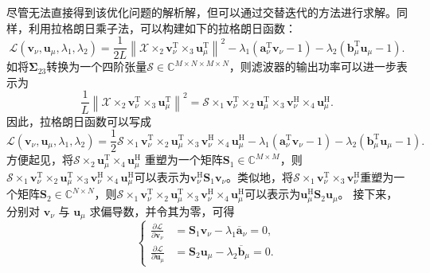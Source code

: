 尽管无法直接得到该优化问题的解析解，但可以通过交替迭代的方法进行求解。同样，利用拉格朗日乘子法，可以构建如下的拉格朗日函数：
\[
    \mathcal{L}(\bm{v}_{\nu}, \bm{u}_{\mu}, \lambda_1, \lambda_2)
    = \frac{1}{2L} \left\| \mathcal{X} \times_2 \bm{v}_{\nu}^{\mathrm{T}} \times_3 \bm{u}_{\mu}^{\mathrm{T}} \right\|^2
    - \lambda_1 \left( \bm{a}^{\mathrm{T}}_{\nu} \bm{v}_{\nu} - 1 \right)
    - \lambda_2 \left( \bm{b}^{\mathrm{T}}_{\mu} \bm{u}_{\mu} - 1 \right).
\]
如将\( \mathbf{\Sigma}_{23} \)转换为一个四阶张量\( \mathcal{S} \in \mathbb{C}^{M \times N \times M \times N} \)，则滤波器的输出功率可以进一步表示为
\[
    \frac{1}{L} \left\| \mathcal{X} \times_2 \bm{v}_{\nu}^{\mathrm{T}} \times_3 \bm{u}_{\mu}^{\mathrm{T}} \right\|^2 = \mathcal{S} \times_1 \bm{v}_{\nu}^{\mathrm{T}} \times_2 \bm{u}_{\mu}^{\mathrm{T}} \times_3 \bm{v}_{\nu}^{\mathrm{H}} \times_4 \bm{u}_{\mu}^{\mathrm{H}}.
\]
因此，拉格朗日函数可以写成
\[
    \mathcal{L}(\bm{v}_{\nu}, \bm{u}_{\mu}, \lambda_1, \lambda_2)
    = \frac{1}{2}\mathcal{S} \times_1 \bm{v}_{\nu}^{\mathrm{T}} \times_2 \bm{u}_{\mu}^{\mathrm{T}} \times_3 \bm{v}_{\nu}^{\mathrm{H}} \times_4 \bm{u}_{\mu}^{\mathrm{H}}
    - \lambda_1 \left( \bm{a}^{\mathrm{T}}_{\nu} \bm{v}_{\nu} - 1 \right)
    - \lambda_2 \left( \bm{b}^{\mathrm{T}}_{\mu} \bm{u}_{\mu} - 1 \right).
\]
方便起见，将\(\mathcal{S} \times_2 \bm{u}_{\mu}^{\mathrm{T}} \times_4 \bm{u}_{\mu}^{\mathrm{H}}\) 重塑为一个矩阵\( \mathbf{S}_{1} \in \mathbb{C}^{M \times M} \)，则\(  \mathcal{S} \times_1 \bm{v}_{\nu}^{\mathrm{T}} \times_2 \bm{u}_{\mu}^{\mathrm{T}} \times_3 \bm{v}_{\nu}^{\mathrm{H}} \times_4 \bm{u}_{\mu}^{\mathrm{H}} \)可以表示为\(\bm{v}_{\nu}^{\mathrm{H}} \mathbf{S}_1 \bm{v}_{\nu}\)。类似地，将\(\mathcal{S} \times_1 \bm{v}_{\nu}^{\mathrm{T}} \times_3 \bm{v}_{\nu}^{\mathrm{H}}\)重塑为一个矩阵\( \mathbf{S}_{2} \in \mathbb{C}^{N \times N} \)，则\(  \mathcal{S} \times_1 \bm{v}_{\nu}^{\mathrm{T}} \times_2 \bm{u}_{\mu}^{\mathrm{T}} \times_3 \bm{v}_{\nu}^{\mathrm{H}} \times_4 \bm{u}_{\mu}^{\mathrm{H}} \)可以表示为\(\bm{u}_{\mu}^{\mathrm{H}} \mathbf{S}_2 \bm{u}_{\mu}\)。
接下来，分别对 \( \bm{v}_{\nu} \) 与 \( \bm{u}_{\mu} \) 求偏导数，并令其为零，可得
\[
    \begin{cases}
        \frac{\partial \mathcal{L}}{\partial \bm{v}_{\nu}}
         & = \mathbf{S}_1 \bm{v}_{\nu} - \lambda_1 \overline{\bm{a}}_{\nu} = 0, \\
        \frac{\partial \mathcal{L}}{\partial \bm{u}_{\mu}}
         & = \mathbf{S}_2 \bm{u}_{\mu} - \lambda_2 \overline{\bm{b}}_{\mu} = 0.
    \end{cases}
\]
